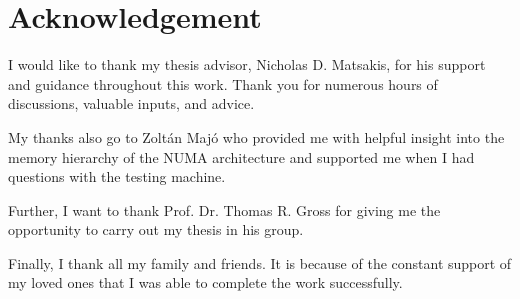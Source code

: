 
\chapter*{Acknowledgement}

I would like to thank my thesis advisor, Nicholas D. Matsakis, for his
support and guidance throughout this work. Thank you for numerous
hours of discussions, valuable inputs, and advice.

My thanks also go to Zoltán Majó who provided me with helpful insight
into the memory hierarchy of the NUMA architecture and supported me
when I had questions with the testing machine.

Further, I want to thank Prof. Dr. Thomas R. Gross for giving me the
opportunity to carry out my thesis in his group.

Finally, I thank all my family and friends. It is because of the
constant support of my loved ones that I was able to complete the work
successfully.


